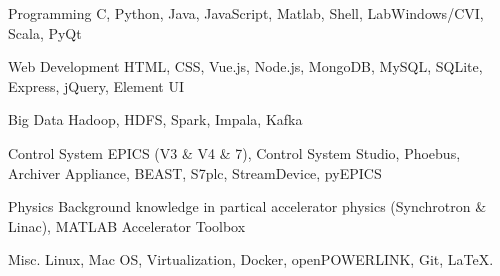 

\begin{cvskills}

  \cvskill
    {Programming} %
    {C, Python, Java, JavaScript, Matlab, Shell, LabWindows/CVI, Scala, PyQt} %

  \cvskill
    {Web Development} %
    {HTML, CSS, Vue.js, Node.js, MongoDB, MySQL, SQLite, Express, jQuery, Element UI} %

  \cvskill
	{Big Data} %
    {Hadoop, HDFS, Spark, Impala, Kafka} %

  \cvskill
   {Control System} %
   {EPICS (V3 \& V4 \& 7), Control System Studio, Phoebus, Archiver Appliance, BEAST, S7plc, StreamDevice, pyEPICS} %

  \cvskill
    {Physics} %
    {Background knowledge in partical accelerator physics (Synchrotron \& Linac), MATLAB Accelerator Toolbox} %

  \cvskill
    {Misc.} %
    {Linux, Mac OS, Virtualization, Docker, openPOWERLINK, Git, \LaTeX.} %
  
\end{cvskills}

